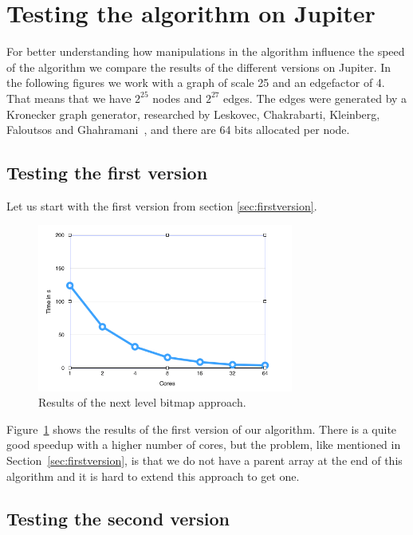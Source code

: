 \documentclass[12pt,a4paper]{article}
\begin{document}
\section{Testing the algorithm on Jupiter}
\label{sec:testing}

For better understanding how manipulations in the algorithm influence the speed of the algorithm we compare the results of the different versions on Jupiter. In the following figures we work with a graph of scale 25 and an edgefactor of 4. That means that we have \(2^{25}\) nodes and \(2^{27}\) edges. The edges were generated by a Kronecker graph generator, researched by Leskovec, Chakrabarti, Kleinberg, Faloutsos and Ghahramani~\cite{kronecker}, and there are 64 bits allocated per node.

\subsection{Testing the first version}

Let us start with the first version from section \ref{sec:firstversion}.

\begin{figure}[!ht]
   \centering
   \includegraphics[width=0.75\textwidth]{next_level}
   \caption{Results of the next level bitmap approach.}
   \label{fig:nextbitmap}
\end{figure}

Figure~\ref{fig:nextbitmap} shows the results of the first version of our algorithm. There is a quite good speedup with a higher number of cores, but the problem, like mentioned in Section~\ref{sec:firstversion}, is that we do not have a parent array at the end of this algorithm and it is hard to extend this approach to get one.

\subsection{Testing the second version}
\end{document}
